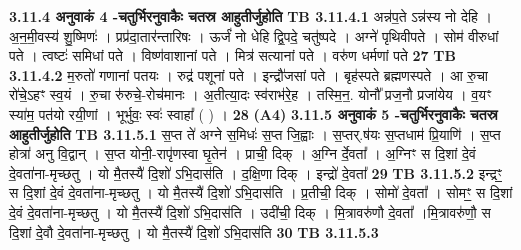 \documentclass[17pt]{extarticle}
\begin{document}
{{{{{{{{{{{{{{{{{{{{{{                \textbf{ 3.11.4    अनुवाकं   4 -चतुर्भिरनुवाकैः चतस्र आहुतीर्जुहोति} \newline
                                \textbf{ TB 3.11.4.1} \newline
                  अन्न॑प॒ते ऽन्न॑स्य नो देहि । अ॒न॒मी॒वस्य॑ शु॒ष्मिणः॑ । प्रप्र॑दा॒तार॑न्तारिषः । ऊर्जं॑ नो धेहि द्वि॒पदे॒ चतु॑ष्पदे । अग्ने॑ पृथिवीपते । सोम॑ वीरुधां पते । त्वष्टः॑ समिधां पते । विष्ण॑वाशानां पते । मित्र॑ सत्यानां पते । वरु॑ण धर्मणां पते \textbf{ 27} \newline
                  \newline
                                \textbf{ TB 3.11.4.2} \newline
                  म॒रुतो॑ गणानां पतयः । रुद्र॑ पशूनां पते । इन्द्रौ॑जसां पते । बृह॑स्पते ब्रह्मणस्पते । आ रु॒चा रो॑चे॒ऽहꣳ स्व॒यं । रु॒चा रु॑रुचे॒-रोच॑मानः । अ॒तीत्या॒दः स्व॑राभ॑रे॒ह । तस्मि॒न॒. योनौ᳚ प्रज॒नौ प्रजा॑येय । व॒यꣳ स्या॑म॒ पत॑यो रयी॒णां । भूर्भुवः॒ स्वः॑ स्वाहा᳚ ( ) । \textbf{ 28} \newline
                  \newline
                                    [वरु॑ण धर्मणां पते॒ स्वः॑ - स्वाहा᳚ ( ) ] \textbf{(A4)} \newline \newline
                \textbf{ 3.11.5    अनुवाकं   5 -चतुर्भिरनुवाकैः चतस्र आहुतीर्जुहोति} \newline
                                \textbf{ TB 3.11.5.1} \newline
                  स॒प्त ते॑ अग्ने स॒मिधः॑ स॒प्त जि॒ह्वाः । स॒प्तर्.ष॑यः स॒प्तधाम॑ प्रि॒याणि॑ । स॒प्त होत्रा॑ अनु वि॒द्वान् । स॒प्त योनी॒-रापृ॑णस्वा घृ॒तेन॑ । प्राची॒ दिक् । अ॒ग्नि र्दे॒वता᳚ । अ॒ग्निꣳ स दि॒शां दे॒वं दे॒वता॑ना-मृच्छतु । यो मै॒तस्यै॑ दि॒शो॑ ऽभि॒दास॑ति । द॒क्षि॒णा दिक् । इन्द्रो॑ दे॒वता᳚ \textbf{ 29} \newline
                  \newline
                                \textbf{ TB 3.11.5.2} \newline
                  इन्द्रꣳ॒॒ स दि॒शां दे॒वं दे॒वता॑ना-मृच्छतु । यो मै॒तस्यै॑ दि॒शो॑ ऽभि॒दास॑ति । प्र॒तीची॒ दिक् । सोमो॑ दे॒वता᳚ । सोमꣳ॒॒ स दि॒शां दे॒वं दे॒वता॑ना-मृच्छतु । यो मै॒तस्यै॑ दि॒शो॑ ऽभि॒दास॑ति । उदी॑ची॒ दिक् । मि॒त्रावरु॑णौ दे॒वता᳚ ।मि॒त्रावरु॑णौ॒ स दि॒शां दे॒वौ दे॒वता॑ना-मृच्छतु । यो मै॒तस्यै॑ दि॒शो॑ ऽभि॒दास॑ति \textbf{ 30} \newline
                  \newline
                                \textbf{ TB 3.11.5.3} \newline
}}}}}}}}}}}}}}}}}}}}}}
\end{document}
